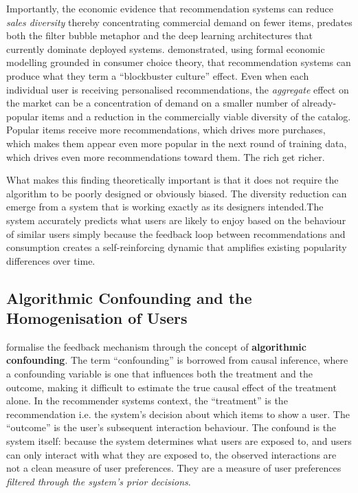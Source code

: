 \documentclass[11pt,a4paper]{report}
\begin{document}
Importantly, the economic evidence that recommendation systems can reduce \emph{sales diversity} thereby concentrating commercial demand on fewer items, predates both the filter bubble metaphor and the deep learning architectures that currently dominate deployed systems. \citet{fleder2009blockbuster} demonstrated, using formal economic modelling grounded in consumer choice theory, that recommendation systems can produce what they term a ``blockbuster culture'' effect. Even when each individual user is receiving personalised recommendations, the \emph{aggregate} effect on the market can be a concentration of demand on a smaller number of already-popular items and a reduction in the commercially viable diversity of the catalog. Popular items receive more recommendations, which drives more purchases, which makes them appear even more popular in the next round of training data, which drives even more recommendations toward them. The rich get richer.

What makes this finding theoretically important is that it does not require the algorithm to be poorly designed or obviously biased. The diversity reduction can emerge from a system that is working exactly as its designers intended.The system accurately predicts what users are likely to enjoy based on the behaviour of similar users simply because the feedback loop between recommendations and consumption creates a self-reinforcing dynamic that amplifies existing popularity differences over time.

\subsection*{Algorithmic Confounding and the Homogenisation of Users}

\citet{chaney2018algorithmic} formalise the feedback mechanism through the concept of \textbf{algorithmic confounding}. The term ``confounding'' is borrowed from causal inference, where a confounding variable is one that influences both the treatment and the outcome, making it difficult to estimate the true causal effect of the treatment alone. In the recommender systems context, the ``treatment'' is the recommendation i.e. the system's decision about which items to show a user. The ``outcome'' is the user's subsequent interaction behaviour. The confound is the system itself: because the system determines what users are exposed to, and users can only interact with what they are exposed to, the observed interactions are not a clean measure of user preferences. They are a measure of user preferences \emph{filtered through the system's prior decisions}.
\end{document}
